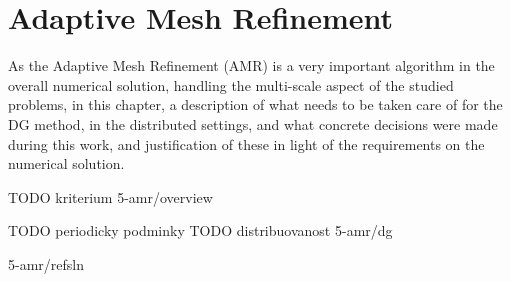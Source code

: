 \chapter{Adaptive Mesh Refinement}
As the Adaptive Mesh Refinement (AMR) is a very important algorithm in the overall numerical solution, handling the multi-scale aspect of the studied problems, in this chapter, a description of what needs to be taken care of for the DG method, in the distributed settings, and what concrete decisions were made during this work, and justification of these in light of the requirements on the numerical solution.

TODO kriterium
 {5-amr/overview}

TODO periodicky podminky
TODO distribuovanost
 {5-amr/dg}

 {5-amr/refsln}
